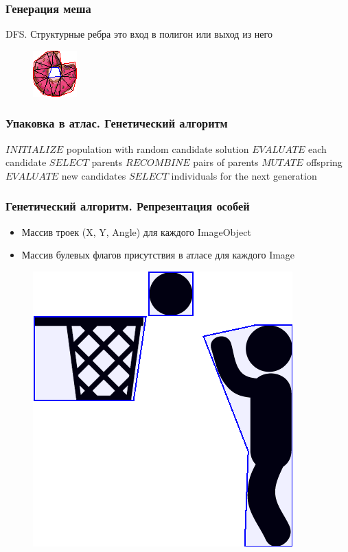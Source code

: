 \documentclass[10pt, unicode]{beamer}
\begin{document}
    \begin{frame}
        \frametitle{Генерация меша}
        DFS. Структурные ребра это вход в полигон или выход из него
        \begin{figure}[H]
            \centering
            \includegraphics[scale=1.5]{donutpixel_mesh.png}
        \end{figure}
    \end{frame}
    \begin{frame}
        \frametitle{Упаковка в атлас. Генетический алгоритм}
        \begin{center}
            \begin{algorithmic}[1]
                \State $INITIALIZE$ population with random candidate solution
                \State $EVALUATE$ each candidate
                    \State $SELECT$ parents
                    \State $RECOMBINE$ pairs of parents
                    \State $MUTATE$ offspring
                    \State $EVALUATE$ new candidates
                    \State $SELECT$ individuals for the next generation
                \EndWhile
            \end{algorithmic}
        \end{center}
    \end{frame}
    \begin{frame}
        \frametitle{Генетический алгоритм. Репрезентация особей}
        \begin{itemize}
            \item Массив троек (X, Y, Angle) для каждого ImageObject
            \item Массив булевых флагов присутствия в атласе для каждого Image
        \end{itemize}
        \begin{figure}[H]
            \centering
            \includegraphics[scale=0.35]{basketball.png}
        \end{figure}
    \end{frame}
\end{document}
